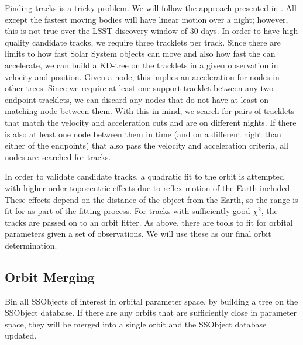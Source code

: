Finding tracks is a tricky problem.  We will follow the approach presented in \cite{kubica05}.  All except the fastest moving bodies will have linear motion over a night; however, this is not true over the LSST discovery window of 30 days.  In order to have high quality candidate tracks, we require three tracklets per track.  Since there are limits to how fast Solar System objects can move and also how fast the can accelerate, we can build a KD-tree on the tracklets in a given observation in velocity and position.  Given a node, this implies an acceleration for nodes in other trees.  Since we require at least one support tracklet between any two endpoint tracklets, we can discard any nodes that do not have at least on matching node between them.  With this in mind, we search for pairs of tracklets that match the velocity and acceleration cuts and are on different nights.  If there is also at least one node between them in time (and on a different night than either of the endpoints) that also pass the velocity and acceleration criteria, all nodes are searched for tracks.

In order to validate candidate tracks, a quadratic fit to the orbit is attempted with higher order topocentric effects due to reflex motion of the Earth included.  These effects depend on the distance of the object from the Earth, so the range is fit for as part of the fitting process.  For tracks with sufficiently good $\chi^2$, the tracks are passed on to an orbit fitter.  As above, there are tools to fit for orbital parameters given a set of observations.  We will use these as our final orbit determination.

\subsection{Orbit Merging}
\label{sec:acOrbitMerging}
Bin all SSObjects of interest in orbital parameter space, by building a tree on the SSObject database.  If there are any orbits that are sufficiently close in parameter space, they will be merged into a single orbit and the SSObject database updated.
